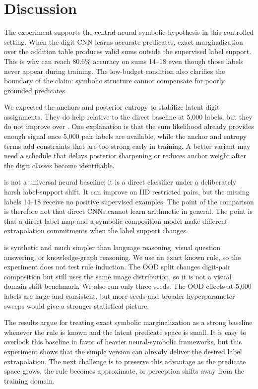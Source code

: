 \section{Discussion}
\label{sec:discussion}

 The experiment supports the central neural-symbolic hypothesis in this controlled setting. When the digit CNN learns accurate predicates, exact marginalization over the addition table produces valid sums outside the supervised label support. This is why \symbolicsum can reach 80.6\% accuracy on sums 14--18 even though those labels never appear during training. The low-budget condition also clarifies the boundary of the claim: symbolic structure cannot compensate for poorly grounded predicates.

 We expected the anchors and posterior entropy to stabilize latent digit assignments. They do help relative to the direct baseline at 5,000 labels, but they do not improve over \symbolicsum. One explanation is that the sum likelihood already provides enough signal once 5,000 pair labels are available, while the anchor and entropy terms add constraints that are too strong early in training. A better variant may need a schedule that delays posterior sharpening or reduces anchor weight after the digit classes become identifiable.

 \directsum is not a universal neural baseline; it is a direct classifier under a deliberately harsh label-support shift. It can improve on IID restricted pairs, but the missing labels 14--18 receive no positive supervised examples. The point of the comparison is therefore not that direct CNNs cannot learn \mnist arithmetic in general. The point is that a direct label map and a symbolic composition model make different extrapolation commitments when the label support changes.

 \addmnist is synthetic and much simpler than language reasoning, visual question answering, or knowledge-graph reasoning. We use an exact known rule, so the experiment does not test rule induction. The OOD split changes digit-pair composition but still uses the same \mnist image distribution, so it is not a visual domain-shift benchmark. We also run only three seeds. The OOD effects at 5,000 labels are large and consistent, but more seeds and broader hyperparameter sweeps would give a stronger statistical picture.

 The results argue for treating exact symbolic marginalization as a strong baseline whenever the rule is known and the latent predicate space is small. It is easy to overlook this baseline in favor of heavier neural-symbolic frameworks, but this experiment shows that the simple version can already deliver the desired label extrapolation. The next challenge is to preserve this advantage as the predicate space grows, the rule becomes approximate, or perception shifts away from the training domain.
